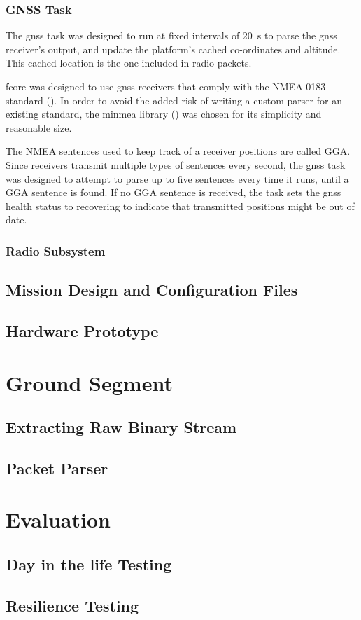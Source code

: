 \subsubsection{GNSS Task}

The \acrshort{gnss} task was designed to run at fixed intervals of
\SI{20}{\second} to parse the \acrshort{gnss} receiver's output, and update the
platform's cached co-ordinates and altitude. This cached location is the one
included in radio packets.

\acrshort{fcore} was designed to use \acrshort{gnss} receivers that comply with
the NMEA 0183 standard (\cite{Bekte2001}). In order to avoid the added risk of
writing a custom parser for an existing standard, the minmea library
(\cite{Moczek2016}) was chosen for its simplicity and reasonable size.

The NMEA sentences used to keep track of a receiver positions are called GGA.
Since receivers transmit multiple types of sentences every second, the
\acrshort{gnss} task was designed to attempt to parse up to five sentences
every time it runs, until a GGA sentence is found. If no GGA sentence is 
received, the task sets the \acrshort{gnss} health status to recovering to
indicate that transmitted positions might be out of date.

\subsubsection{Radio Subsystem}

\subsection{Mission Design and Configuration Files}
\label{sssec:conf-file}


\subsection{Hardware Prototype}
\label{sec:flight-hardware}

\section{Ground Segment}
\label{sec:ground-segment}

\subsection{Extracting Raw Binary Stream}
\label{sec:binary-extraction}

\subsection{Packet Parser}

\section{Evaluation}
\label{sec:testing}

\subsection{Day in the life Testing}
\label{ssec:method-ditl}

\subsection{Resilience Testing}
\label{ssec:method-resilience}